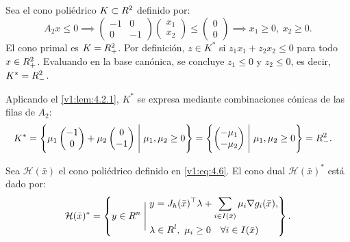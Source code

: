 \begin{example}\label{v1:exa:lema_farkas}
 Sea el cono poliédrico $K \subset R^2$ definido por:
 \[
 A_2 x \le 0 \implies \begin{pmatrix} -1 & 0 \\ 0 & -1 \end{pmatrix} \begin{pmatrix} x_1 \\ x_2 \end{pmatrix} \le \begin{pmatrix} 0 \\ 0 \end{pmatrix} \implies x_1 \ge 0, \ x_2 \ge 0.
 \]
 El cono primal es $K = R_+^2$. Por definición, $z \in K^*$ si $z_1 x_1 + z_2 x_2 \le 0$ para todo $x \in R_+^2$. Evaluando en la base canónica, se concluye $z_1 \le 0$ y $z_2 \le 0$, es decir, $K^* = R_-^2$.
 
 Aplicando el \cref{v1:lem:4.2.1}, $K^*$ se expresa mediante combinaciones cónicas de las filas de $A_2$:
 \begin{align*}
 K^* &= \left\{ \mu_1 \begin{pmatrix} -1 \\ 0 \end{pmatrix} + \mu_2 \begin{pmatrix} 0 \\ -1 \end{pmatrix} \mathrel{\Bigg|} \mu_1, \mu_2 \ge 0 \right\} = \left\{ \begin{pmatrix} -\mu_1 \\ -\mu_2 \end{pmatrix} \mathrel{\Bigg|} \mu_1, \mu_2 \ge 0 \right\} = R_-^2.
 \end{align*}
\end{example}

\begin{lemma}\label{v1:lem:dual_cono_linealizacion}
 Sea $\mathcal{H}(\bar{x})$ el cono poliédrico definido en \eqref{v1:eq:4.6}. El cono dual $\mathcal{H}(\bar{x})^*$ está dado por:
 \begin{equation}
 \mathcal{H}(\bar{x})^* = \left\{ y \in R^n \mathrel{\Bigg|} \begin{aligned} &y = J_h(\bar{x})^\top \lambda + \sum_{i \in I(\bar{x})} \mu_i \nabla g_i(\bar{x}), \\ &\lambda \in R^l, \ \mu_i \ge 0 \quad \forall i \in I(\bar{x}) \end{aligned} \right\}.
 \label{v1:eq:dual_cono_linealizacion}
 \end{equation}
\end{lemma}

